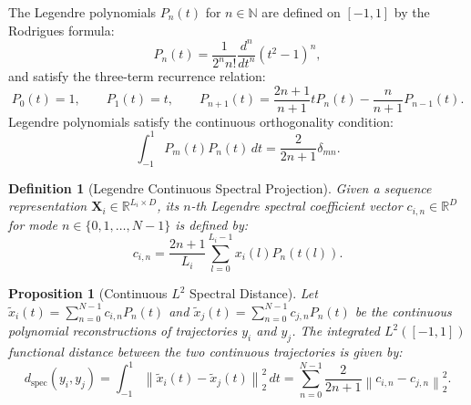 \documentclass{article}
\newtheorem{proposition}{Proposition}
\newtheorem{definition}{Definition}
\begin{document}
The Legendre polynomials $P_n(t)$ for $n \in \mathbb{N}$ are defined on $[-1, 1]$ by the Rodrigues formula:
\begin{equation}
  P_n(t) = \frac{1}{2^n n!} \frac{d^n}{dt^n} \left( t^2 - 1 \right)^n,
  \label{eq:rodrigues}
\end{equation}
and satisfy the three-term recurrence relation:
\begin{equation}
  P_0(t) = 1, \qquad P_1(t) = t, \qquad P_{n+1}(t) = \frac{2n+1}{n+1} t P_n(t) - \frac{n}{n+1} P_{n-1}(t).
  \label{eq:legendre_recurrence}
\end{equation}
Legendre polynomials satisfy the continuous orthogonality condition:
\begin{equation}
  \int_{-1}^1 P_m(t) P_n(t) \, dt = \frac{2}{2n+1} \delta_{mn}.
  \label{eq:legendre_orthogonality}
\end{equation}

\begin{definition}[Legendre Continuous Spectral Projection]
Given a sequence representation $\mathbf{X}_i \in \mathbb{R}^{L_i \times D}$, its $n$-th Legendre spectral coefficient vector $c_{i,n} \in \mathbb{R}^D$ for mode $n \in \{0, 1, \dots, N-1\}$ is defined by:
\begin{equation}
  c_{i,n} = \frac{2n+1}{L_i} \sum_{l=0}^{L_i-1} x_i(l) P_n(t(l)).
  \label{eq:spectral_coeff}
\end{equation}
\end{definition}

\begin{proposition}[Continuous $L^2$ Spectral Distance]
\label{prop:l2_distance}
Let $\tilde{x}_i(t) = \sum_{n=0}^{N-1} c_{i,n} P_n(t)$ and $\tilde{x}_j(t) = \sum_{n=0}^{N-1} c_{j,n} P_n(t)$ be the continuous polynomial reconstructions of trajectories $y_i$ and $y_j$. The integrated $L^2([-1, 1])$ functional distance between the two continuous trajectories is given by:
\begin{equation}
  d_{\text{spec}}(y_i, y_j) = \int_{-1}^1 \left\| \tilde{x}_i(t) - \tilde{x}_j(t) \right\|_2^2 \, dt = \sum_{n=0}^{N-1} \frac{2}{2n+1} \left\| c_{i,n} - c_{j,n} \right\|_2^2.
  \label{eq:spectral_distance}
\end{equation}
\end{proposition}
\end{document}
